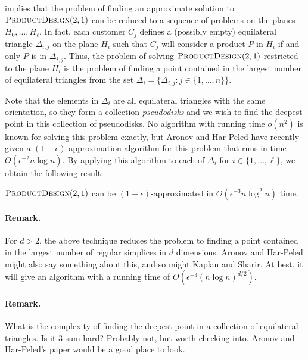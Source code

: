 \documentclass[lotsofwhite]{patmorin}
\begin{document}
 implies that the problem of finding an
approximate solution to  $\textsc{ProductDesign}(2,1)$ can be reduced
to a sequence of problems on the planes $H_0,\ldots,H_\ell$.  In fact,
each customer $C_j$ defines a (possibly empty) equilateral triangle
$\Delta_{i,j}$ on the plane $H_i$ such that $C_j$ will consider a
product $P$ in $H_i$ if and only $P$ is in $\Delta_{i,j}$.  Thus, the
problem of solving $\textsc{ProductDesign}(2,1)$ restricted to the
plane $H_i$ is the problem of finding a point contained in the largest
number of equilateral triangles from the set $\Delta_i=\{\Delta_{i,j}:
j\in\{1,\ldots,n\}\}$.

Note that the elements in $\Delta_i$ are all equilateral triangles
with the same orientation, so they form a collection
\emph{pseudodisks} and we wish to find the deepest point in this
collection of pseudodisks.  No algorithm with running time $o(n^2)$ is
known for solving this problem exactly, but Aronov and Har-Peled have
recently given a $(1-\epsilon)$-approximation algorithm for this
problem that runs in time $O(\epsilon^{-2}n\log n)$.  By applying this
algorithm to each of $\Delta_i$ for $i\in\{1,\ldots,\ell\}$, we obtain
the following result:

\begin{thm}
  $\textsc{ProductDesign}(2,1)$ can be $(1-\epsilon)$-approximated in
  $O(\epsilon^{-3}n\log^2 n)$ time.
\end{thm}

\paragraph{Remark.}
For $d>2$, the above technique reduces the problem to finding a point
contained in the largest number of regular simplices in
$d$ dimensions.  Aronov and Har-Peled might also say something about
this, and so might Kaplan and Sharir.  At best, it will give an
algorithm with a running time of $O(\epsilon^{-3}(n\log n)^{d/2})$.

\paragraph{Remark.} What is the complexity of finding the deepest
point in a collection of equilateral triangles.  Is it 3-sum hard?
Probably not, but worth checking into.  Aronov and Har-Peled's paper
would be a good place to look.
\end{document}
